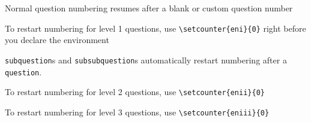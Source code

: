 \documentclass{gerot-assignment}
\begin{document}
\begin{question}
    Normal question numbering resumes after a blank or custom question number
\end{question}

\setcounter{eni}{0}
\begin{question}
    To restart numbering for level 1 questions, use \verb|\setcounter{eni}{0}| right before you declare the environment
\end{question}

\begin{subquestion}
    \verb|subquestion|s and \verb|subsubquestion|s automatically restart numbering after a \verb|question|. 
\end{subquestion}

\setcounter{enii}{0}
\begin{subquestion}
    To restart numbering for level 2 questions, use \verb|\setcounter{enii}{0}|
\end{subquestion}
\begin{subsubquestion}
\end{subsubquestion}
\setcounter{eniii}{0}
\begin{subsubquestion}
    To restart numbering for level 3 questions, use \verb|\setcounter{eniii}{0}|
\end{subsubquestion}
\end{document}

